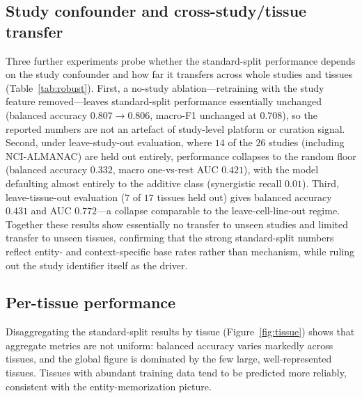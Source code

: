 \documentclass{bmcart}
\begin{document}
\subsection*{Study confounder and cross-study/tissue transfer}
Three further experiments probe whether the standard-split performance depends on the study confounder
and how far it transfers across whole studies and tissues (Table~\ref{tab:robust}). First, a no-study
ablation---retraining with the study feature removed---leaves standard-split performance essentially
unchanged (balanced accuracy $0.807\rightarrow0.806$, macro-F1 unchanged at $0.708$), so the reported
numbers are not an artefact of study-level platform or curation signal. Second, under leave-study-out
evaluation, where $14$ of the $26$ studies (including NCI-ALMANAC) are held out entirely, performance
collapses to the random floor (balanced accuracy $0.332$, macro one-vs-rest AUC $0.421$), with the
model defaulting almost entirely to the additive class (synergistic recall $0.01$). Third,
leave-tissue-out evaluation ($7$ of $17$ tissues held out) gives balanced accuracy $0.431$ and AUC
$0.772$---a collapse comparable to the leave-cell-line-out regime. Together these results show
essentially no transfer to unseen studies and limited transfer to unseen tissues, confirming that the
strong standard-split numbers reflect entity- and context-specific base rates rather than mechanism,
while ruling out the study identifier itself as the driver.

\subsection*{Per-tissue performance}
Disaggregating the standard-split results by tissue (Figure~\ref{fig:tissue}) shows that aggregate
metrics are not uniform: balanced accuracy varies markedly across tissues, and the global figure is
dominated by the few large, well-represented tissues. Tissues with abundant training data tend to be
predicted more reliably, consistent with the entity-memorization picture.

\end{document}
